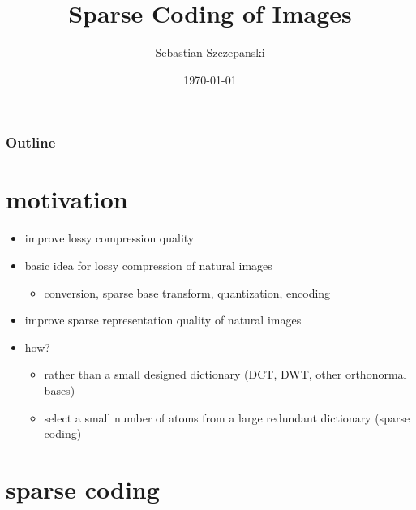 




\title{Sparse Coding of Images}
\author{Sebastian Szczepanski}
\date{\today}

\begin{frame}
\titlepage
\end{frame}

\begin{frame}
\frametitle{Outline}
\tableofcontents %
\end{frame}


\section{motivation}
\begin{frame}
\begin{itemize}
\item improve lossy compression quality
\item basic idea for lossy compression of natural images
	\begin{itemize}
	\item  conversion, sparse base transform, quantization, encoding
	\end{itemize}
\pause
\item improve sparse representation quality of natural images 
\pause
\item how?
\pause
	\begin{itemize}
	\item rather than a small designed dictionary (DCT, DWT, other orthonormal bases)	
	\pause
	\item select a small number of atoms from a large redundant dictionary (sparse coding)
	\end{itemize}
\end{itemize}
\end{frame}

\section{sparse coding}



